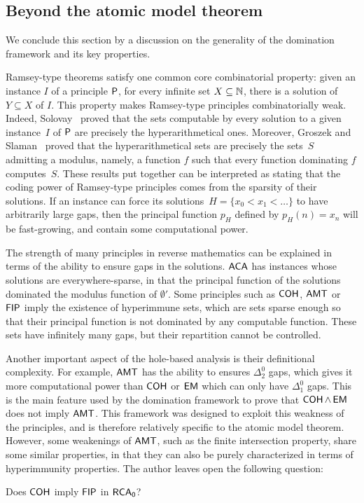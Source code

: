 \subsection{Beyond the atomic model theorem}

We conclude this section by a discussion on the generality of the domination framework and
its key properties.

Ramsey-type theorems satisfy one common core combinatorial property: given an instance $I$ of a principle $\mathsf{P}$,
for every infinite set $X \subseteq \mathbb{N}$, there is a solution of~$Y \subseteq X$ of $I$.
This property makes Ramsey-type principles combinatorially weak. Indeed, Solovay~\cite{Solovay1978Hyperarithmetically}
proved that the sets computable by every solution to a given instance~$I$ of $\mathsf{P}$ are precisely
the hyperarithmetical ones.  Moreover, Groszek and Slaman~\cite{Groszek2007Moduli} proved that the hyperarithmetical 
sets are precisely the sets~$S$ admitting a modulus, namely,
a function $f$ such that every function dominating $f$ computes~$S$. These results put together can be interpreted
as stating that the coding power of Ramsey-type principles comes from the sparsity of their solutions.
If an instance can force its solutions~$H = \{x_0 < x_1 < \dots \}$ to have arbitrarily large gaps, then the principal function
$p_H$ defined by $p_H(n) = x_n$ will be fast-growing, and contain some computational power.

The strength of many principles in reverse mathematics can be explained 
in terms of the ability to ensure gaps in the solutions.
$\operatorname{\sf{ACA}}$ has instances whose solutions are everywhere-sparse, in that the principal function
of the solutions dominated the modulus function of $\emptyset'$.
Some principles such as $\operatorname{\sf{COH}}$, $\operatorname{\sf{AMT}}$ or $\operatorname{\sf{FIP}}$ imply the existence of hyperimmune sets,
which are sets sparse enough so that their principal function is not dominated by any computable function.
These sets have infinitely many gaps, but their repartition cannot be controlled.

Another important aspect of the hole-based analysis is their definitional complexity.
For example, $\operatorname{\sf{AMT}}$ has the ability to ensures $\Delta^0_2$ gaps, which gives it more computational power
than $\operatorname{\sf{COH}}$ or $\operatorname{\sf{EM}}$ which can only have $\Delta^0_1$ gaps. This is the main feature used by the domination framework
to prove that $\operatorname{\sf{COH}} \wedge \operatorname{\sf{EM}}$ does not imply $\operatorname{\sf{AMT}}$.
This framework was designed to exploit this weakness of the principles, and is therefore relatively specific to
the atomic model theorem. However, some weakenings of $\operatorname{\sf{AMT}}$, such as the finite intersection property,
share some similar properties, in that they can also be purely characterized in terms of hyperimmunity properties.
The author leaves open the following question:

\begin{question}
Does $\operatorname{\sf{COH}}$ imply $\operatorname{\sf{FIP}}$ in $\operatorname{\sf{RCA}_0}$?
\end{question}





